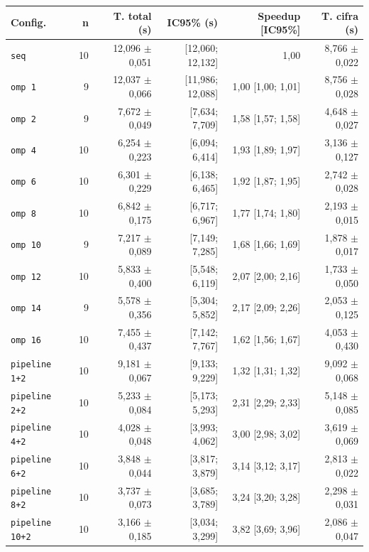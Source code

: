 
\begin{tabular}{lrrrrr}
\hline
\textbf{Config.} & \textbf{n} & \textbf{T. total (s)} & \textbf{IC95\% (s)} & \textbf{Speedup [IC95\%]} & \textbf{T. cifra (s)} \\
\hline
\texttt{seq} & 10 & 12,096 $\pm$ 0,051 & [12,060; 12,132] & 1,00 & 8,766 $\pm$ 0,022 \\
\texttt{omp 1} & 9 & 12,037 $\pm$ 0,066 & [11,986; 12,088] & 1,00 [1,00; 1,01] & 8,756 $\pm$ 0,028 \\
\texttt{omp 2} & 9 & 7,672 $\pm$ 0,049 & [7,634; 7,709] & 1,58 [1,57; 1,58] & 4,648 $\pm$ 0,027 \\
\texttt{omp 4} & 10 & 6,254 $\pm$ 0,223 & [6,094; 6,414] & 1,93 [1,89; 1,97] & 3,136 $\pm$ 0,127 \\
\texttt{omp 6} & 10 & 6,301 $\pm$ 0,229 & [6,138; 6,465] & 1,92 [1,87; 1,95] & 2,742 $\pm$ 0,028 \\
\texttt{omp 8} & 10 & 6,842 $\pm$ 0,175 & [6,717; 6,967] & 1,77 [1,74; 1,80] & 2,193 $\pm$ 0,015 \\
\texttt{omp 10} & 9 & 7,217 $\pm$ 0,089 & [7,149; 7,285] & 1,68 [1,66; 1,69] & 1,878 $\pm$ 0,017 \\
\texttt{omp 12} & 10 & 5,833 $\pm$ 0,400 & [5,548; 6,119] & 2,07 [2,00; 2,16] & 1,733 $\pm$ 0,050 \\
\texttt{omp 14} & 9 & 5,578 $\pm$ 0,356 & [5,304; 5,852] & 2,17 [2,09; 2,26] & 2,053 $\pm$ 0,125 \\
\texttt{omp 16} & 10 & 7,455 $\pm$ 0,437 & [7,142; 7,767] & 1,62 [1,56; 1,67] & 4,053 $\pm$ 0,430 \\
\texttt{pipeline 1+2} & 10 & 9,181 $\pm$ 0,067 & [9,133; 9,229] & 1,32 [1,31; 1,32] & 9,092 $\pm$ 0,068 \\
\texttt{pipeline 2+2} & 10 & 5,233 $\pm$ 0,084 & [5,173; 5,293] & 2,31 [2,29; 2,33] & 5,148 $\pm$ 0,085 \\
\texttt{pipeline 4+2} & 10 & 4,028 $\pm$ 0,048 & [3,993; 4,062] & 3,00 [2,98; 3,02] & 3,619 $\pm$ 0,069 \\
\texttt{pipeline 6+2} & 10 & 3,848 $\pm$ 0,044 & [3,817; 3,879] & 3,14 [3,12; 3,17] & 2,813 $\pm$ 0,022 \\
\texttt{pipeline 8+2} & 10 & 3,737 $\pm$ 0,073 & [3,685; 3,789] & 3,24 [3,20; 3,28] & 2,298 $\pm$ 0,031 \\
\texttt{pipeline 10+2} & 10 & 3,166 $\pm$ 0,185 & [3,034; 3,299] & 3,82 [3,69; 3,96] & 2,086 $\pm$ 0,047 \\

\end{tabular}
